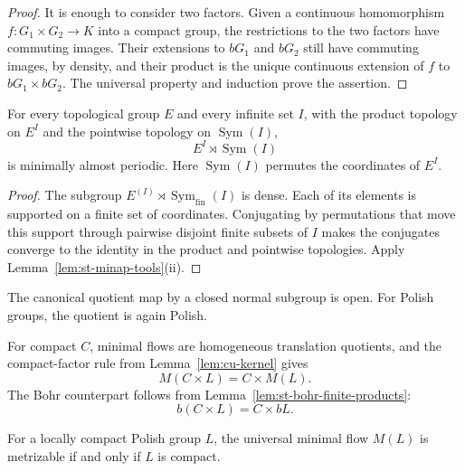 \begin{proof}
It is enough to consider two factors. Given a continuous homomorphism $f:G_1\times G_2\to K$ into a compact group, the restrictions to the two
factors have commuting images. Their extensions to $bG_1$ and $bG_2$ still
have commuting images, by density, and their product is the unique
continuous extension of $f$ to $bG_1\times bG_2$. The universal property and
induction prove the assertion.
\end{proof}

\begin{corollary}\label{cor:st-wreath-minap}
 For every topological group $E$ and every infinite
set $I$, with the product topology on $E^I$ and the pointwise topology on $\operatorname{Sym}(I)$, 
\begin{equation*}
E^I\rtimes\operatorname{Sym}(I) 
\end{equation*}
is minimally almost periodic. Here $\operatorname{Sym}(I)$ permutes the coordinates of $E^I
$.
\end{corollary}

\begin{proof}
The subgroup $E^{(I)}\rtimes\operatorname{Sym}_{\mathrm{fin}}(I)$ is dense. Each of its
elements is supported on a finite set of coordinates. Conjugating by
permutations that move this support through pairwise disjoint finite subsets
of $I$ makes the conjugates converge to the identity in the product and
pointwise topologies. Apply Lemma~\ref{lem:st-minap-tools}(ii).
\end{proof}

The canonical quotient map by a closed normal subgroup is open. For Polish
groups, the quotient is again Polish.

For compact \(C\), minimal flows are homogeneous translation quotients,
and the compact-factor rule from Lemma~\ref{lem:cu-kernel} gives
\begin{equation}\label{eq:st-compact-product}
 M(C\times L)=C\times M(L).
\end{equation}
The Bohr counterpart follows from Lemma~\ref{lem:st-bohr-finite-products}:
\begin{equation}\label{eq:st-compact-product-bohr}
 b(C\times L)=C\times bL.
\end{equation}

\begin{lemma}\label{lem:st-locally-compact-umf}
 For a locally compact Polish group $L$, the
universal minimal flow $M(L)$ is metrizable if and only if $L$ is compact.
\end{lemma}

